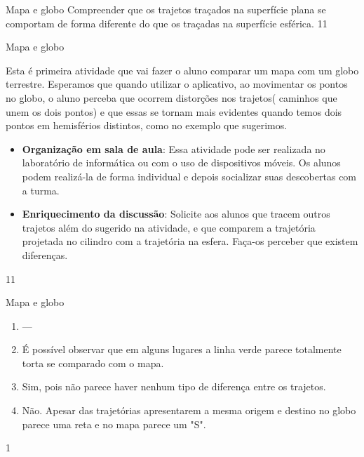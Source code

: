 \clearpage

\begin{objectives}{Mapa e globo}
{
Compreender que os trajetos traçados na superfície plana se comportam de forma diferente do que os traçadas na superfície esférica.
}{1}{1}
\end{objectives}

\begin{sugestions}{Mapa e globo}
{
  Esta é primeira atividade que vai fazer o aluno comparar um mapa com um globo terrestre. Esperamos que quando utilizar o aplicativo, ao movimentar os pontos no globo, o aluno perceba que ocorrem distorções nos trajetos( caminhos que unem os dois pontos) e que essas se tornam mais evidentes quando temos dois pontos em hemisférios distintos, como no exemplo que sugerimos.

  \begin{itemize}
  \item \textbf{Organização em sala de aula}: Essa atividade pode ser realizada no laboratório de informática ou com o uso de dispositivos móveis. Os alunos podem realizá-la de forma individual e depois socializar suas descobertas com a turma.
  \item \textbf{Enriquecimento da discussão}: Solicite aos alunos que tracem outros trajetos além do sugerido na atividade, e que comparem a trajetória projetada no cilindro com a trajetória na esfera. Faça-os perceber que existem diferenças.
  \end{itemize}
}{1}{1}
\end{sugestions}
\begin{answer}{Mapa e globo}
{
  \begin{enumerate}
  \item ---
  \item É possível observar que em alguns lugares a linha verde parece totalmente torta se comparado com o mapa.
  \item Sim, pois não parece haver nenhum tipo de diferença entre os trajetos.
  \item Não. Apesar das trajetórias apresentarem  a mesma origem e destino no globo parece uma reta e no mapa parece um "S".
  \end{enumerate}
}{1}
\end{answer}

